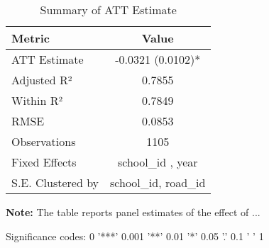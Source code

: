 \begin{table}[H]
\centering
\caption{Summary of ATT Estimate}
\label{tab:SA_cl_100p}
 \begin{center}
 \begin{tabular}{lc}
 \toprule
Metric & Value \\
\midrule
ATT Estimate & -0.0321 (0.0102)* \\
\hline 
 Adjusted R² & 0.7855 \\
Within R² & 0.7849 \\
RMSE & 0.0853 \\
Observations & 1105 \\
\hline 
 Fixed Effects & school_id ,  year \\
S.E. Clustered by & school_id, road_id \\
\bottomrule
\end{tabular}
 \end{center}\begin{tablenotes}
\small
\item \textbf{Note:} The table reports panel estimates of the effect of ...
\item Significance codes: 0 '***' 0.001 '**' 0.01 '*' 0.05 '.' 0.1 ' ' 1
\end{tablenotes}
\end{table}